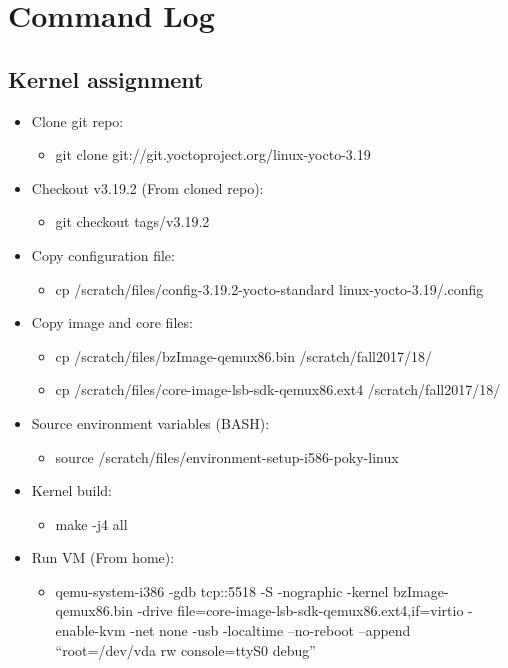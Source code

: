 \documentclass[letterpaper,10pt]{article}
\begin{document}
\section{Command Log}
\subsection{Kernel assignment}
\begin{itemize}
  \item Clone git repo: 
    \begin{itemize}
      \item git clone git://git.yoctoproject.org/linux-yocto-3.19
    \end{itemize}
    \item Checkout v3.19.2 (From cloned repo): 
    \begin{itemize}
      \item git checkout tags/v3.19.2
    \end{itemize}
    \item Copy configuration file: 
    \begin{itemize}
      \item cp /scratch/files/config-3.19.2-yocto-standard linux-yocto-3.19/.config
    \end{itemize}
    \item Copy image and core files: 
    \begin{itemize}
      \item cp /scratch/files/bzImage-qemux86.bin /scratch/fall2017/18/
        \item cp /scratch/files/core-image-lsb-sdk-qemux86.ext4  /scratch/fall2017/18/
    \end{itemize}
    \item Source environment variables (BASH):
        \begin{itemize}
          \item source /scratch/files/environment-setup-i586-poky-linux
        \end{itemize}
        \item Kernel build: 
        \begin{itemize}
          \item make -j4 all
        \end{itemize}
        \item Run VM (From home): 
        \begin{itemize}
          \item qemu-system-i386 -gdb tcp::5518 -S -nographic -kernel bzImage-qemux86.bin -drive file=core-image-lsb-sdk-qemux86.ext4,if=virtio -enable-kvm -net none -usb -localtime --no-reboot --append ``root=/dev/vda rw console=ttyS0 debug''

\end{itemize}
\end{itemize}
\end{document}
